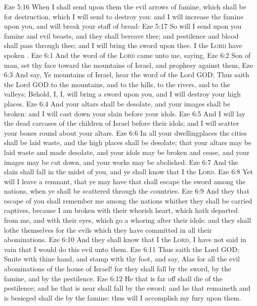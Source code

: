 \vs Eze 5:16 When I shall send upon them the evil arrows of famine, which shall be for  destruction,  which I will send to destroy you: and I will increase the famine upon you, and will break your staff of bread:
\vs Eze 5:17 So will I send upon you famine and evil beasts, and they shall bereave thee; and pestilence and blood shall pass through thee; and I will bring the sword upon thee. I the \textsc{Lord} have spoken .
\vs Eze 6:1 And the word of the \textsc{Lord} came unto me, saying,
\vs Eze 6:2 Son of man, set thy face toward the mountains of Israel, and prophesy against them,
\vs Eze 6:3 And say, Ye mountains of Israel, hear the word of the Lord GOD; Thus saith the Lord GOD to the mountains, and to the hills, to the rivers, and to the valleys; Behold, I,  I, will bring a sword upon you, and I will destroy your high places.
\vs Eze 6:4 And your altars shall be desolate, and your images shall be broken: and I will cast down your slain  before your idols.
\vs Eze 6:5 And I will lay the dead carcases of the children of Israel before their idols; and I will scatter your bones round about your altars.
\vs Eze 6:6 In all your dwellingplaces the cities shall be laid waste, and the high places shall be desolate; that your altars may be laid waste and made desolate, and your idols may be broken and cease, and your images may be cut down, and your works may be abolished.
\vs Eze 6:7 And the slain shall fall in the midst of you, and ye shall know that I  the \textsc{Lord}.
\vs Eze 6:8 Yet will I leave a remnant, that ye may have  that shall escape the sword among the nations, when ye shall be scattered through the countries.
\vs Eze 6:9 And they that escape of you shall remember me among the nations whither they shall be carried captives, because I am broken with their whorish heart, which hath departed from me, and with their eyes, which go a whoring after their idols: and they shall lothe themselves for the evils which they have committed in all their abominations.
\vs Eze 6:10 And they shall know that I  the \textsc{Lord},  I have not said in vain that I would do this evil unto them.
\vs Eze 6:11 Thus saith the Lord GOD; Smite with thine hand, and stamp with thy foot, and say, Alas for all the evil abominations of the house of Israel! for they shall fall by the sword, by the famine, and by the pestilence.
\vs Eze 6:12 He that is far off shall die of the pestilence; and he that is near shall fall by the sword; and he that remaineth and is besieged shall die by the famine: thus will I accomplish my fury upon them.
